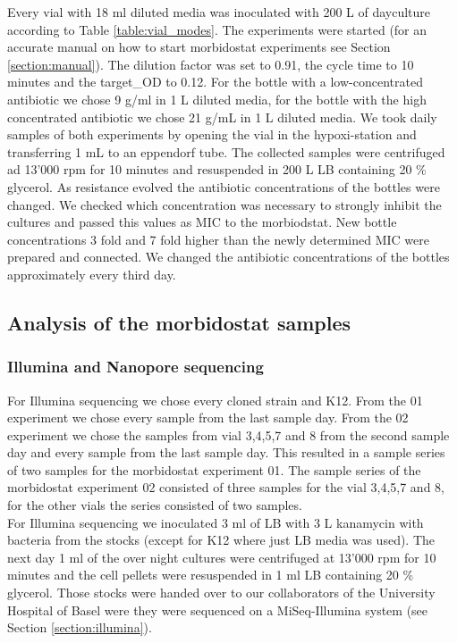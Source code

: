 Every vial with 18 ml diluted media was inoculated with 200 \textmu L of dayculture according to Table \ref{table:vial_modes}. The experiments were started (for an accurate manual on how to start morbidostat experiments see Section \ref{section:manual}). The dilution factor was set to 0.91, the cycle time to 10 minutes and the target\_OD to 0.12. For the bottle with a low-concentrated antibiotic we chose 9 \textmu g/ml in 1 L diluted media, for the bottle with the high concentrated antibiotic we chose 21 \textmu g/mL in 1 L diluted media. We took daily samples of both experiments by opening the vial in the hypoxi-station and transferring 1 mL to an eppendorf tube. The collected samples were centrifuged ad 13'000 rpm for 10 minutes and resuspended in 200 \textmu L LB containing 20 \% glycerol. As resistance evolved the antibiotic concentrations of the bottles were changed. We checked which concentration was necessary to strongly inhibit the cultures and passed this values as MIC to the morbiodstat. New bottle concentrations 3 fold and 7 fold higher than the newly determined MIC were prepared and connected. We changed the antibiotic concentrations of the bottles approximately every third day.\\

\subsection{Analysis of the morbidostat samples}
\subsubsection{Illumina and Nanopore sequencing}
For Illumina sequencing we chose every cloned strain and K12. From the 01 experiment we chose every sample from the last sample day. From the 02 experiment we chose the samples from vial 3,4,5,7 and 8 from the second sample day and every sample from the last sample day. This resulted in a sample series of two samples for the morbidostat experiment 01. The sample series of the morbidostat experiment 02 consisted of three samples for the vial 3,4,5,7 and 8, for the other vials the series consisted of two samples. \\
For Illumina sequencing we inoculated 3 ml of LB with 3 \textmu L kanamycin with bacteria from the stocks (except for K12 where just LB media was used). The next day 1 ml of the over night cultures were centrifuged at 13'000 rpm for 10 minutes and the cell pellets were resuspended in 1 ml LB containing 20 \% glycerol. Those stocks were handed over to our collaborators of the University Hospital of Basel were they were sequenced on a MiSeq-Illumina system (see Section \ref{section:illumina}). \\

